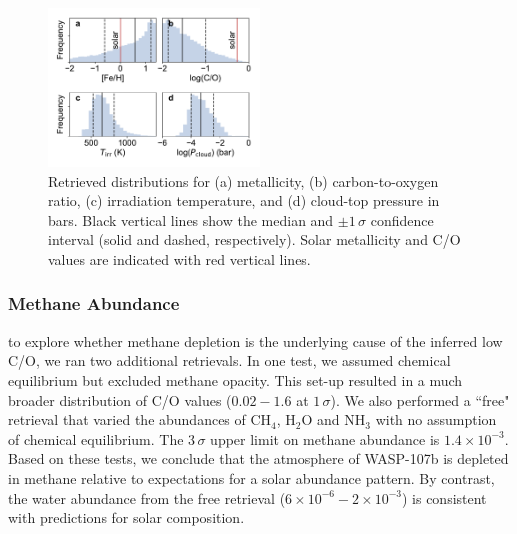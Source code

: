 \documentclass[twocolumn, trackchanges]{aastex61}
\begin{document}
\begin{figure}
\includegraphics[width = 0.5\textwidth]{fig4_retrieval.pdf}
\caption{Retrieved distributions for (a) metallicity, (b) carbon-to-oxygen ratio, (c) irradiation temperature, and (d) cloud-top pressure in bars. Black vertical lines show the median and $\pm1\,\sigma$ confidence interval (solid and dashed, respectively). Solar metallicity and C/O values are indicated with red vertical lines.}  \label{fig:retrieval}
\end{figure}

\subsubsection{Methane Abundance}
 to explore whether methane depletion is the underlying cause of the inferred low C/O, we ran two additional retrievals.  In one test, we assumed chemical equilibrium but excluded methane opacity. This set-up resulted in a much broader distribution of C/O values ($0.02 - 1.6$ at $1\,\sigma$).  We also performed a ``free" retrieval that varied the abundances of CH$_4$, H$_2$O and NH$_3$ with no assumption of chemical equilibrium. The $3\,\sigma$ upper limit on methane abundance is $1.4\times10^{-3}$.  Based on these tests, we conclude that the atmosphere of WASP-107b is  depleted in methane relative to expectations for a solar abundance pattern. By contrast, the water abundance from the free retrieval ($6\times10^{-6} - 2\times10^{-3}$) is consistent with predictions for solar composition. 
	
\end{document}
